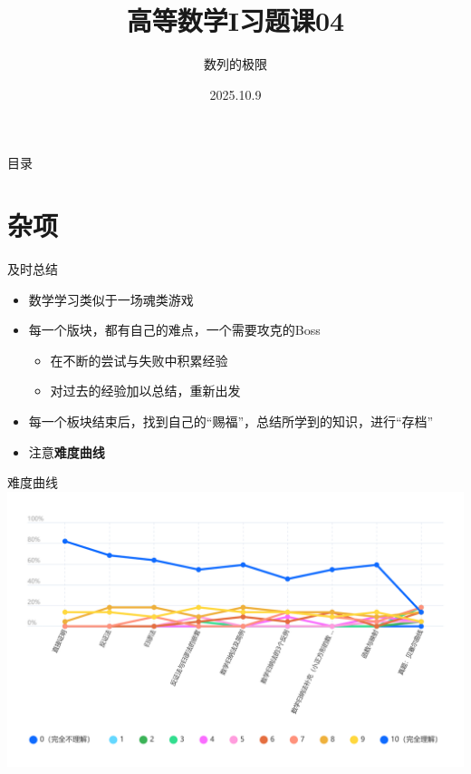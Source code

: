 \documentclass[]{beamer}
\title{高等数学I\quad 习题课04}
\subtitle{数列的极限}
\date[2025.10.9]{2025.10.9}
\author[上海科技大学]{}
\institute[]{上海科技大学}
\begin{document}
\begin{frame}
    \vspace{15pt}
    \titlepage
\end{frame}


\begin{frame}{目录}
    \tableofcontents
\end{frame}



\section{杂项}

\begin{frame}{及时总结}
    \begin{itemize}
        \item 数学学习类似于一场魂类游戏
        \item 每一个版块，都有自己的难点，一个需要攻克的Boss
        \begin{itemize}
            \item 在不断的尝试与失败中积累经验
            \item 对过去的经验加以总结，重新出发
        \end{itemize}
        \item 每一个板块结束后，找到自己的“赐福”，总结所学到的知识，进行“存档”
        \item 注意\textbf{难度曲线}
    \end{itemize}
\end{frame}

\begin{frame}{难度曲线}
    \includegraphics[width=\linewidth]{chart (1).png}
\end{frame}
\end{document}
